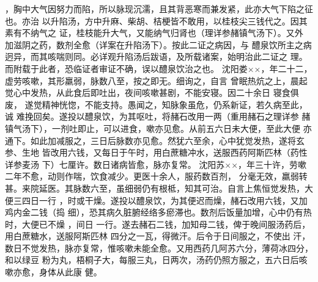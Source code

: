\documentclass[a4paper,12pt,UTF8,twoside]{ctexbook}
\begin{document}
，胸中大气因努力而陷，所以脉现沉濡，且其背恶寒而兼发紧，此亦大气下陷之征也。亦治 
以升陷汤，方中升麻、柴胡、桔梗皆不敢用，以桂枝尖三钱代之。因其素有不纳气之 
证，桂枝能升大气，又能纳气归肾也（理详参赭镇气汤下）。又外 
加滋阴之药，数剂全愈（详案在升陷汤下）。按此二证之病因，与 
醴泉饮所主之病迥异，而其咳喘则同。必详观升陷汤后跋语，及所载诸案，始明治此二证之 
理。而附载于此者，恐临证者审证不确，误以醴泉饮治之也。 
沈阳娄××，年二十二，虚劳咳嗽，其形羸弱，脉数八至，按之即无。细询之，自言 
曾眠热炕之上，晨起觉心中发热，从此食后即吐出，夜间咳嗽甚剧，不能安寝。因二十余日 
寝食俱废， 遂觉精神恍惚，不能支持。愚闻之，知脉象虽危，仍系新证，若久病至此，诚 
难挽回矣。遂投以醴泉饮，为其呕吐，将赭石改用一两（重用赭石之理详参 
赭镇气汤下），一剂吐即止，可以进食，嗽亦见愈。从前五六日未大便，至此大便 
亦通下。如此加减服之，三日后脉数亦见愈。然犹六至余，心中犹觉发热，遂将玄参、生地 
皆改用六钱，又每日于午时，用白蔗糖冲水，送服西药阿斯匹林（药性详参麦汤 
下）七厘许。数日诸病皆愈，脉亦复常。 
沈阳苏××，年三十许，劳嗽二年不愈，动则作喘，饮食减少。更医十余人，服药数百剂， 
分毫无效，羸弱转甚。来院延医。其脉数六至，虽细弱仍有根柢，知其可治。自言上焦恒觉发热，大便三四日一行 
，时或干燥。遂投以醴泉饮，为其便迟而燥，赭石改用六钱，又加鸡内金二钱（捣 
细），恐其病久脏腑经络多瘀滞也。数剂后饭量加增，心中仍有热时，大便已不燥 
，间日 一行。遂去赭石二钱，加知母二钱，俾于晚间服汤药后，用白蔗糖水，送服阿斯匹林 
四分之一瓦，得微汗。后令于日间服之，不使出 
汗，数日不觉发热，脉亦复常，惟咳嗽未能全愈。又用西药几阿苏六分，薄荷冰四分，和以绿豆 
粉为丸，梧桐子大，每服三丸，日两次，汤药仍照方服之，五六日后咳嗽亦愈，身体从此康 
健。 
\end{document}
